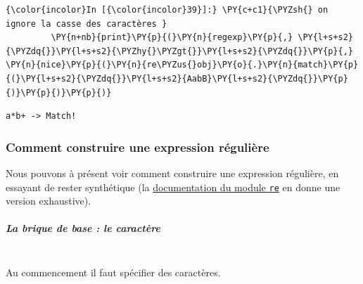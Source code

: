     \begin{Verbatim}[commandchars=\\\{\}]
{\color{incolor}In [{\color{incolor}39}]:} \PY{c+c1}{\PYZsh{} on ignore la casse des caractères }
         \PY{n+nb}{print}\PY{p}{(}\PY{n}{regexp}\PY{p}{,} \PY{l+s+s2}{\PYZdq{}}\PY{l+s+s2}{\PYZhy{}\PYZgt{}}\PY{l+s+s2}{\PYZdq{}}\PY{p}{,} \PY{n}{nice}\PY{p}{(}\PY{n}{re\PYZus{}obj}\PY{o}{.}\PY{n}{match}\PY{p}{(}\PY{l+s+s2}{\PYZdq{}}\PY{l+s+s2}{AabB}\PY{l+s+s2}{\PYZdq{}}\PY{p}{)}\PY{p}{)}\PY{p}{)}
\end{Verbatim}


    \begin{Verbatim}[commandchars=\\\{\}]
a*b+ -> Match!

    \end{Verbatim}

    \hypertarget{comment-construire-une-expression-ruxe9guliuxe8re}{%
\subsubsection{Comment construire une expression
régulière}\label{comment-construire-une-expression-ruxe9guliuxe8re}}

    Nous pouvons à présent voir comment construire une expression régulière,
en essayant de rester synthétique (la
\href{https://docs.python.org/3/library/re.html}{documentation du module
\texttt{re}} en donne une version exhaustive).

    \hypertarget{la-brique-de-base-le-caractuxe8re}{%
\subparagraph{La brique de base : le
caractère\\\\}\label{la-brique-de-base-le-caractuxe8re}}

    Au commencement il faut spécifier des caractères.
    
